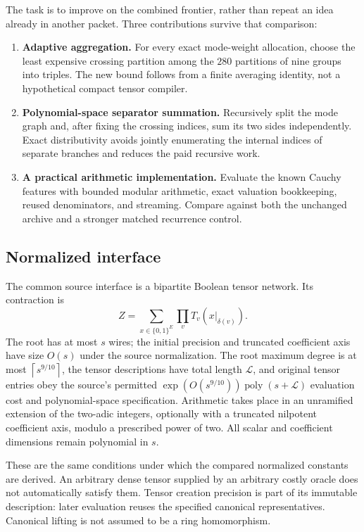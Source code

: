 \documentclass[11pt]{article}
\theoremstyle{definition}\newtheorem{definition}[theorem]{Definition}
\theoremstyle{remark}\newtheorem{remark}[theorem]{Remark}
\newcommand{\poly}{\operatorname{poly}}
\newcommand{\ceil}[1]{\left\lceil#1\right\rceil}
\begin{document}
The task is to improve on the combined frontier, rather than repeat an idea
already in another packet. Three contributions survive that comparison:
\begin{enumerate}
\item \textbf{Adaptive aggregation.} For every exact mode-weight allocation,
choose the least expensive crossing partition among the $280$ partitions of
nine groups into triples. The new bound follows from a finite averaging
identity, not a hypothetical compact tensor compiler.
\item \textbf{Polynomial-space separator summation.} Recursively split the
mode graph and, after fixing the crossing indices, sum its two sides
independently. Exact distributivity avoids jointly enumerating the internal
indices of separate branches and reduces the paid recursive work.
\item \textbf{A practical arithmetic implementation.} Evaluate the known
Cauchy features with bounded modular arithmetic, exact valuation bookkeeping,
reused denominators, and streaming. Compare against both the unchanged
archive and a stronger matched recurrence control.
\end{enumerate}

\subsection{Normalized interface}

The common source interface is a bipartite Boolean tensor network. Its
contraction is
\[
 Z=\sum_{x\in\{0,1\}^{E}}\prod_v T_v(x|_{\delta(v)}).
\]
The root has at most $s$ wires; the initial precision and truncated coefficient
axis have size $O(s)$ under the source normalization. The root maximum degree
is at most $\ceil{s^{9/10}}$, the tensor descriptions have total length
$\mathcal L$, and original tensor entries obey the source's permitted
$\exp(O(s^{9/10}))\poly(s+\mathcal L)$ evaluation cost and polynomial-space
specification. Arithmetic takes place in an unramified extension of the
two-adic integers, optionally with a truncated nilpotent coefficient axis,
modulo a prescribed power of two. All scalar and coefficient dimensions
remain polynomial in $s$.

These are the same conditions under which the compared normalized constants
are derived. An arbitrary dense tensor supplied by an arbitrary costly oracle
does not automatically satisfy them. Tensor creation precision is part of
its immutable description: later evaluation reuses the specified canonical
representatives. Canonical lifting is not assumed to be a ring homomorphism.
\end{document}
